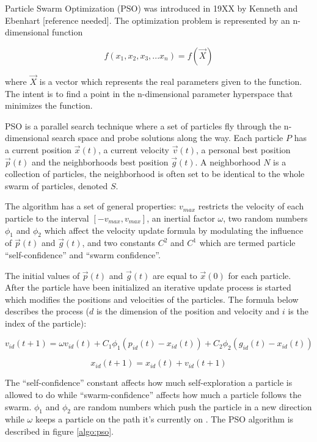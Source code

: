 Particle Swarm Optimization (PSO) was introduced in 19XX by Kenneth and Ebenhart [reference needed]. The optimization problem is represented by an n-dimensional function

\begin{equation}
  f(x_1,x_2,x_3,...x_n) = f(\vec{X})
\end{equation}

where $\vec{X}$ is a vector which represents the real parameters given to the function. The intent is to find a point in the n-dimensional parameter hyperspace that minimizes the function.

PSO is a parallel search technique where a set of particles  fly through the n-dimensional search space and probe solutions along the way. Each particle $P$ has a current position $\vec{x}(t)$, a current velocity $\vec{v}(t)$, a personal best position $\vec{p}(t)$ and the neighborhoods best position $\vec{g}(t)$. A neighborhood $N$ is a collection of particles, the neighborhood is often set to be identical to the whole swarm of particles, denoted $S$.

The algorithm has a set of general properties: $v_{max}$ restricts the velocity of each particle to the interval $[-v_{max},v_{max}]$, an inertial factor $\omega$, two random numbers $\phi_1$ and $\phi_2$ which affect the velocity update formula by modulating the influence of $\vec{p}(t)$ and $\vec{g}(t)$, and two constants $C^2$ and $C^1$ which are termed particle “self-confidence” and “swarm confidence”.

The initial values of $\vec{p}(t)$ and $\vec{g}(t)$ are equal to $\vec{x}(0)$ for each particle. After the particle have been initialized an iterative update process is started which modifies the positions and velocities of the particles. The formula below describes the process ($d$ is the dimension of the position and velocity and $i$ is the index of the particle):

\begin{equation}
  v_{id} (t+1) = \omega v_{id} (t) + C_1 \phi_1 (p_{id} (t) - x_{id} (t)) + C_2 \phi_2 (g_{id} (t) - x_{id} (t))
\end{equation}

\begin{equation}
  x_{id} (t+1) = x_{id} (t) + v_{id} (t+1)
\end{equation}

The “self-confidence” constant affects how much self-exploration a particle is allowed to do while “swarm-confidence” affects how much a particle follows the swarm. $\phi_1$ and $\phi_2$ are random numbers which push the particle in a new direction while $\omega$ keeps a particle on the path it’s currently on \cite{Das2008}. The PSO algorithm is described in figure \ref{algo:pso}.

